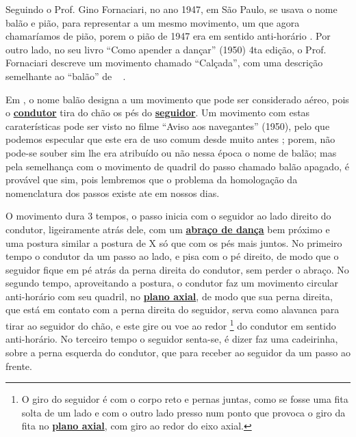 Seguindo o Prof. Gino Fornaciari, no ano 1947,  em São Paulo, se usava o nome balão e pião,
para representar a um mesmo movimento, um que agora chamaríamos de pião, 
porem o pião de 1947 era em sentido anti-horário \cite[pp. 68-72]{fornaciari1947aprender}.
Por outro lado, no seu livro ``Como apender a dançar'' (1950) 4ta edição,
o Prof. Fornaciari descreve um movimento  chamado ``Calçada'', com uma descrição semelhante 
ao ``balão'' de \AnoLivro~ \cite[pp. 162]{fornaciari1950aprender}.

Em \AnoLivro, o nome balão designa a um movimento que pode ser considerado aéreo, 
pois o \hyperref[def:Condutor]{\textbf{condutor}} tira do chão os pés do \hyperref[def:Seguidor]{\textbf{seguidor}}.
Um movimento com estas caraterísticas pode ser visto no filme ``Aviso aos navegantes'' (1950),
pelo que podemos especular que este era de uso comum desde muito antes \cite[min. 40:35]{AtlantidaDance};
porem, não pode-se souber sim lhe era atribuído ou não nessa época o nome de balão; 
mas pela semelhança com o movimento de quadril do passo chamado balão apagado,
é provável que sim, 
pois lembremos que o problema da homologação da nomenclatura dos passos existe ate em  nossos dias.



O movimento dura 3 tempos, o passo inicia com o seguidor ao lado direito do condutor, 
ligeiramente atrás dele, com um \hyperref[def:abracodedanca]{\textbf{abraço de dança}} 
bem próximo e uma postura similar a postura de X só que com os pés mais juntos.
No primeiro tempo o condutor da um passo ao lado, e pisa com o pé direito,
de modo que o seguidor fique em pé atrás da perna direita do condutor, sem perder o abraço.
No segundo tempo, aproveitando a postura, 
o condutor faz um movimento circular anti-horário com seu quadril, no \hyperref[def:PlanoAxial]{\textbf{plano axial}},
de modo que sua perna direita, que está em contato com a perna direita do seguidor,
serva como alavanca para tirar ao seguidor do chão, 
e este gire ou voe ao redor \footnote{O giro do seguidor é com o corpo reto e pernas juntas, 
como se fosse uma fita solta de um lado e com o outro lado presso num ponto 
que provoca o giro da fita no \hyperref[def:PlanoAxial]{\textbf{plano axial}}, com giro ao redor do eixo axial.} 
do condutor em sentido anti-horário.
No terceiro tempo o seguidor senta-se, é dizer faz uma cadeirinha, sobre a perna esquerda do condutor,
que para receber ao seguidor  da um passo ao frente.

